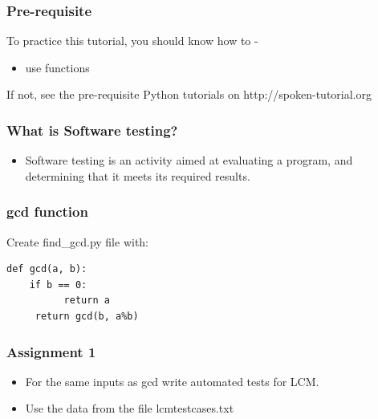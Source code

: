 \documentclass[17pt]{beamer}
\begin{document}
\begin{frame}
	\frametitle{Pre-requisite}
	\label{sec-3}
	
	To practice this tutorial, you should know how to -\pause
	
	\begin{itemize}
		\item use functions\pause
	\end{itemize}
	If not, see the pre-requisite Python tutorials on {\color{blue}http://spoken-tutorial.org}
\end{frame}
\begin{frame}[fragile]
	\frametitle{What is Software testing?}
	
	\begin{itemize}
		\item Software testing is an activity aimed at evaluating a program, and determining that it meets its required results.
	\end{itemize}
\end{frame}
\begin{frame}[fragile]
\frametitle{gcd function}

 Create find\_gcd.py file with:\\

\begin{lstlisting}
def gcd(a, b):
    if b == 0:
          return a
     return gcd(b, a%b)   
\end{lstlisting}
\end{frame}
\begin{frame}
\frametitle{Assignment 1}

\begin{itemize}
\item For the same inputs as gcd write automated tests for LCM.\pause
\item Use the data from the file lcmtestcases.txt
\end{itemize}
\end{frame}
\end{document}
